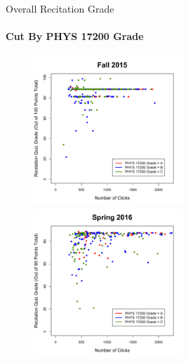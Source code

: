 \documentclass[xcolor=x11names,compress]{beamer}
\begin{document}
\begin{frame}{Overall Recitation Grade}
	\framesubtitle{Cut By PHYS 17200 Grade}
	\begin{figure}
		\includegraphics[width=0.5\textwidth]{img/recitation_fa15_172.pdf}
		\includegraphics[width=0.5\textwidth]{img/recitation_sp16_172.pdf}
	\end{figure}
\end{frame}
\end{document}
